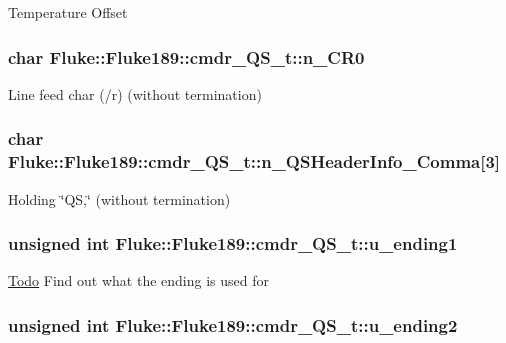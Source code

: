 \label{structFluke_1_1Fluke189_1_1cmdr__QS__t_a3ae4f44738b591f2dc068793861f2ea3}
Temperature Offset \hypertarget{structFluke_1_1Fluke189_1_1cmdr__QS__t_ac75ebbfd5c0fca3ed9debbf46fc71b61}{
\subsubsection[{n\_\-CR0}]{\setlength{\rightskip}{0pt plus 5cm}char {\bf Fluke::Fluke189::cmdr\_\-QS\_\-t::n\_\-CR0}}}
\label{structFluke_1_1Fluke189_1_1cmdr__QS__t_ac75ebbfd5c0fca3ed9debbf46fc71b61}
Line feed char (/r) (without termination) \hypertarget{structFluke_1_1Fluke189_1_1cmdr__QS__t_af2e192902c6c5598c38ebd1c33b3efd4}{
\subsubsection[{n\_\-QSHeaderInfo\_\-Comma}]{\setlength{\rightskip}{0pt plus 5cm}char {\bf Fluke::Fluke189::cmdr\_\-QS\_\-t::n\_\-QSHeaderInfo\_\-Comma}\mbox{[}3\mbox{]}}}
\label{structFluke_1_1Fluke189_1_1cmdr__QS__t_af2e192902c6c5598c38ebd1c33b3efd4}
Holding \char`\"{}QS,\char`\"{} (without termination) \hypertarget{structFluke_1_1Fluke189_1_1cmdr__QS__t_ae5e99fd781866c32cdba484e15276d7a}{
\subsubsection[{u\_\-ending1}]{\setlength{\rightskip}{0pt plus 5cm}unsigned int {\bf Fluke::Fluke189::cmdr\_\-QS\_\-t::u\_\-ending1}}}
\label{structFluke_1_1Fluke189_1_1cmdr__QS__t_ae5e99fd781866c32cdba484e15276d7a}
\begin{Desc}
\item[\hyperlink{todo__todo000006}{Todo}]Find out what the ending is used for \end{Desc}
\hypertarget{structFluke_1_1Fluke189_1_1cmdr__QS__t_a08dec92163b6c7a734cdf4aa185d0875}{
\subsubsection[{u\_\-ending2}]{\setlength{\rightskip}{0pt plus 5cm}unsigned int {\bf Fluke::Fluke189::cmdr\_\-QS\_\-t::u\_\-ending2}}}
